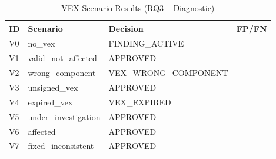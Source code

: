 \begin{table}[htbp]
\caption{VEX Scenario Results (RQ3 -- Diagnostic)}
\label{tab:vex-scenarios}
\centering\small
\begin{tabular}{llll}
\toprule
\textbf{ID} & \textbf{Scenario} & \textbf{Decision} & \textbf{FP/FN} \\
\midrule
  V0 & no\_vex & FINDING\_ACTIVE &  \\
  V1 & valid\_not\_affected & APPROVED &  \\
  V2 & wrong\_component & VEX\_WRONG\_COMPONENT &  \\
  V3 & unsigned\_vex & APPROVED &  \\
  V4 & expired\_vex & VEX\_EXPIRED &  \\
  V5 & under\_investigation & APPROVED &  \\
  V6 & affected & APPROVED &  \\
  V7 & fixed\_inconsistent & APPROVED &  \\
\bottomrule
\end{tabular}
\end{table}